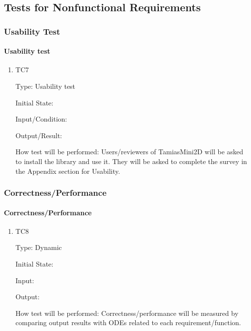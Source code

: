 \documentclass[12pt, titlepage]{article}
\begin{document}
\subsection{Tests for Nonfunctional Requirements}

\subsubsection{Usability Test}
		
\paragraph{Usability test}

\begin{enumerate}

\item{TC7\\}

Type: Usability test
					
Initial State: 
					
Input/Condition: 
					
Output/Result: 
					
How test will be performed: Users/reviewers of TamiasMini2D will be asked to install the library and use it. They will be asked to complete the survey in the Appendix section for Usability. 
					
\end{enumerate}


\subsubsection{Correctness/Performance}

\paragraph{Correctness/Performance}

\begin{enumerate}

\item{TC8\\}

Type: Dynamic

Initial State: 

Input: 

Output: 

How test will be performed: Correctness/performance will be measured by comparing output results with ODEs related to each requirement/function.
\end{enumerate}
\end{document}
